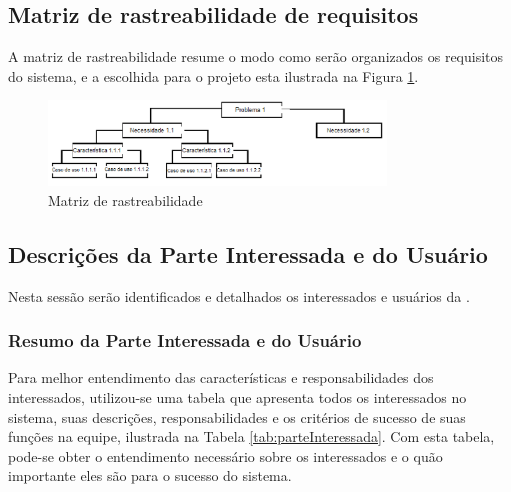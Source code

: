 \subsection{Matriz de rastreabilidade de requisitos}

A matriz de rastreabilidade resume o modo como serão organizados os requisitos do sistema, e a escolhida para o projeto esta ilustrada na Figura \ref{img:rastreabilidade}.

\begin{figure}[H]
	\centering
	\includegraphics[width=0.8\textwidth]{imgModelagem/diagrama}
	\caption{Matriz de rastreabilidade}
	\label{img:rastreabilidade}
\end{figure}

\subsection{Descrições da Parte Interessada e do Usuário}

Nesta sessão serão identificados e detalhados os interessados e usuários da \nomeferramenta{}.

\subsubsection{Resumo da Parte Interessada e do Usuário}

Para melhor entendimento das características e responsabilidades dos interessados, utilizou-se uma tabela que apresenta todos os interessados no sistema, suas descrições, responsabilidades e os critérios de sucesso de suas funções na equipe, ilustrada na Tabela \ref{tab:parteInteressada}. Com esta tabela, pode-se obter o entendimento necessário sobre os interessados e o quão importante eles são para o sucesso do sistema.

